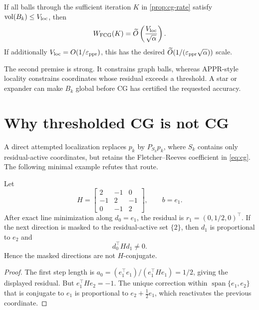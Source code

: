 \documentclass[11pt]{article}
\begin{document}
\begin{corollary}
\label{cor:conditional-work}
If all balls through the sufficient iteration $K$ in
\cref{prop:cg-rate} satisfy $\operatorname{vol}(B_k)\leq V_{\rm loc}$, then
\begin{equation}
 W_{\rm FCG}(K)
 =\widetilde O\left(\frac{V_{\rm loc}}{\sqrt\alpha}\right).
 \label{eq:conditional-work}
\end{equation}
If additionally $V_{\rm loc}=O(1/\varepsilon_{\mathrm{ppr}})$, this has the desired
$\widetilde O(1/(\varepsilon_{\mathrm{ppr}}\sqrt\alpha))$ scale.
\end{corollary}

The second premise is strong. It constrains graph balls, whereas APPR-style
locality constrains coordinates whose residual exceeds a threshold. A star
or expander can make $B_k$ global before CG has certified the requested
accuracy.

\section{Why thresholded CG is not CG}
\label{sec:masking}

A direct attempted localization replaces $p_k$ by
$P_{S_k}p_k$, where $S_k$ contains only residual-active coordinates, but
retains the Fletcher--Reeves coefficient in \cref{eq:cg}. The following
minimal example refutes that route.

\begin{proposition}
\label{prop:masking-obstruction}
Let
\begin{equation}
 H=\begin{bmatrix}
 2&-1&0\\
 -1&2&-1\\
 0&-1&2
 \end{bmatrix},
 \qquad b=e_1.
 \label{eq:three-path}
\end{equation}
After exact line minimization along $d_0=e_1$, the residual is
$r_1=(0,1/2,0)^\top$. If the next direction is masked to the residual-active
set $\{2\}$, then $d_1$ is proportional to $e_2$ and
\begin{equation}
 d_0^\top H d_1\neq0.
\end{equation}
Hence the masked directions are not $H$-conjugate.
\end{proposition}

\begin{proof}
The first step length is
$a_0=(e_1^\top e_1)/(e_1^\top He_1)=1/2$, giving the displayed residual.
But $e_1^\top He_2=-1$. The unique correction within
$\operatorname{span}\{e_1,e_2\}$ that is conjugate to $e_1$ is proportional to
$e_2+\tfrac12e_1$, which reactivates the previous coordinate.
\end{proof}
\end{document}
